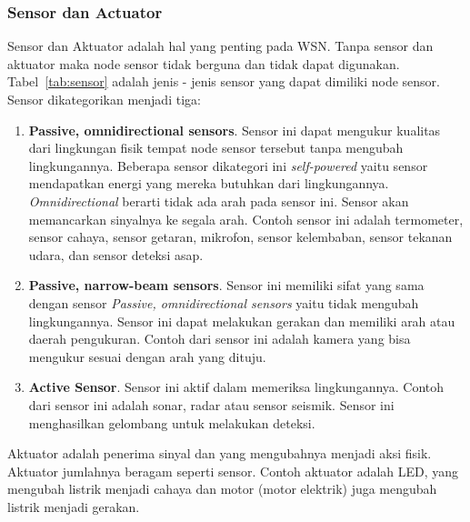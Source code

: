 \subsubsection{Sensor dan Actuator}
Sensor dan Aktuator adalah hal yang penting pada WSN. Tanpa sensor dan aktuator maka node sensor tidak berguna dan tidak dapat digunakan. Tabel~\ref{tab:sensor} adalah jenis - jenis sensor yang dapat dimiliki node sensor. Sensor dikategorikan menjadi tiga:
\begin{enumerate}
	\item \textbf{Passive, omnidirectional sensors}. Sensor ini dapat mengukur kualitas dari lingkungan fisik tempat node sensor tersebut tanpa mengubah lingkungannya. Beberapa sensor dikategori ini \textit{self-powered} yaitu sensor mendapatkan energi yang mereka butuhkan dari lingkungannya. \textit{Omnidirectional} berarti tidak ada arah pada sensor ini. Sensor akan memancarkan sinyalnya ke segala arah. Contoh sensor ini adalah termometer, sensor cahaya, sensor getaran, mikrofon, sensor kelembaban, sensor tekanan udara, dan sensor deteksi asap.
	\item \textbf{Passive, narrow-beam sensors}. Sensor ini memiliki sifat yang sama dengan sensor \textit{Passive, omnidirectional sensors} yaitu tidak mengubah lingkungannya. Sensor ini dapat melakukan gerakan dan memiliki arah atau daerah pengukuran. Contoh dari sensor ini adalah kamera yang bisa mengukur sesuai dengan arah yang dituju.
	\item \textbf{Active Sensor}. Sensor ini aktif dalam memeriksa lingkungannya. Contoh dari sensor ini adalah sonar, radar atau sensor seismik. Sensor ini menghasilkan gelombang untuk melakukan deteksi.
\end{enumerate}

Aktuator adalah penerima sinyal dan yang mengubahnya menjadi aksi fisik. Aktuator jumlahnya beragam seperti sensor.  Contoh aktuator adalah LED, yang mengubah listrik menjadi cahaya dan motor (motor elektrik) juga mengubah listrik menjadi gerakan.

